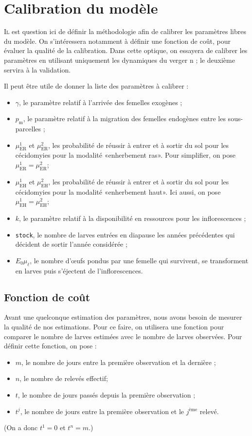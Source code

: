 \chapter{Calibration du modèle} 

\lettrine{I}{l} est question ici de définir la méthodologie afin de calibrer les paramètres libres du modèle.
On s'intéressera notamment à définir une fonction de coût, pour évaluer la qualité de la calibration.
Dans cette optique, on essayera de calibrer les paramètres en utilisant uniquement les dynamiques du verger n ; le deuxième servira à la validation.

Il peut être utile de donner la liste des paramètres à calibrer :
\begin{itemize}
 \item $\gamma$, le paramètre relatif à l'arrivée des femelles exogènes ;
 \item $p_{\text{m}}$, le paramètre relatif à la migration des femelles endogènes entre les sous-parcelles ;
 \item $\mu^{1}_{\text{ER}}$ et $\mu^{2}_{\text{ER}}$, les probabilité de réussir à entrer et à sortir du sol pour les cécidomyies pour la modalité «enherbement ras». Pour simplifier,
 on pose $\mu^{1}_{\text{ER}} = \mu^{2}_{\text{ER}}$;
 \item $\mu^{1}_{\text{EH}}$ et $\mu^{2}_{\text{EH}}$, les probabilité de réussir à entrer et à sortir du sol pour les cécidomyies pour la modalité «enherbement haut». Ici aussi,
 on pose $\mu^{1}_{\text{EH}} = \mu^{2}_{\text{EH}}$;
 \item $k$, le paramètre relatif à la disponibilité en ressources pour les inflorescences ;
 \item \texttt{stock}, le nombre de larves entrées en diapause les années précédentes qui décident de sortir l'année considérée ;
 \item $E_0\mu_{\ell}$, le nombre d'œufs pondus par une femelle qui survivent, se transforment en larves puis s'éjectent de l'inflorescences. 
\end{itemize}


\section{Fonction de coût}

Avant une quelconque estimation des paramètres, nous avons besoin de mesurer la qualité de nos estimations.
Pour ce faire, on utilisera une fonction pour comparer le nombre de larves estimées avec le nombre de larves observées. 
Pour définir cette fonction, on pose :
\begin{itemize}
 \item $m$, le nombre de jours entre la première observation et la dernière ;
 \item $n$, le nombre de relevés effectif;
 \item $t$, le nombre de jours passés depuis la première observation ;
 \item $t^j$, le nombre de jours entre la première observation et le $j^{\text{ème}}$ relevé.
\end{itemize}
(On a donc $t^1 = 0$ et $t^n = m$.)

